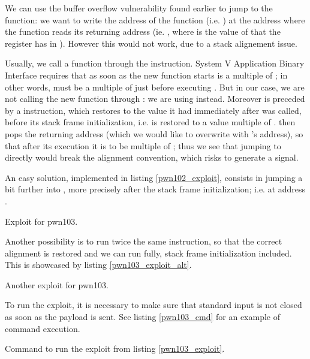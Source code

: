 \par We can use the buffer overflow vulnerability found earlier to jump to the  function: we want to write the address of the function (i.e. ) at the address where the  function reads its returning address (ie. , where  is the value of that the register has in ). However this would not work, due to a stack alignement issue.
\par Usually, we call a function through the  instruction. System V Application Binary Interface requires that as soon as the new function starts  is a multiple of ; in other words,  must be a multiple of  just before executing . But in our case, we are not calling the new function through : we are using  instead. Moreover  is preceded by a  instruction, which restores  to the value it had immediately after  was called, before its stack frame initialization, i.e.  is restored to a value multiple of .  then pops the returning address (which we would like to overwrite with 's address), so that after its execution it is  to be multiple of ; thus we see that jumping to  directly would break the alignment convention, which risks to generate a  signal.
\par An easy solution, implemented in listing \ref{pwn102_exploit}, consists in jumping a bit further into , more precisely after the stack frame initialization; i.e. at address {}.
\begin{listing}
	\caption{Exploit for pwn103.}
	\label{pwn103_exploit}
\end{listing}
\par Another possibility is to run twice the same  instruction, so that the correct alignment is restored and we can run  fully, stack frame initialization included. This is showcased by listing \ref{pwn103_exploit_alt}.
\begin{listing}
	\caption{Another exploit for pwn103.}
	\label{pwn103_exploit_alt}
\end{listing}
\par To run the exploit, it is necessary to make sure that standard input is not closed as soon as the payload is sent. See listing \ref{pwn103_cmd} for an example of command execution.
\begin{listing}
	\caption{Command to run the exploit from listing \ref{pwn103_exploit}.}
	\label{pwn103_cmd}
\end{listing}
